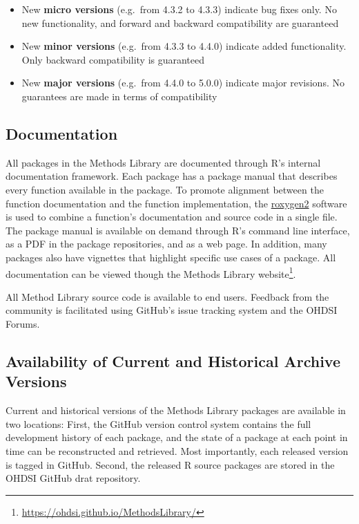 \documentclass[11pt]{book}
\providecommand{\tightlist}{%
  \setlength{\itemsep}{0pt}\setlength{\parskip}{0pt}}
\let\rmarkdownfootnote\footnote%
\def\footnote{\protect\rmarkdownfootnote}
\theoremstyle{definition}
\theoremstyle{definition}
\theoremstyle{definition}
\theoremstyle{remark}
\begin{document}
\begin{itemize}
\tightlist
\item
  New \textbf{micro versions} (e.g.~from 4.3.2 to 4.3.3) indicate bug fixes only. No new functionality, and forward and backward compatibility are guaranteed
\item
  New \textbf{minor versions} (e.g.~from 4.3.3 to 4.4.0) indicate added functionality. Only backward compatibility is guaranteed
\item
  New \textbf{major versions} (e.g.~from 4.4.0 to 5.0.0) indicate major revisions. No guarantees are made in terms of compatibility
\end{itemize}

\hypertarget{documentation-2}{%
\subsection{Documentation}\label{documentation-2}}

All packages in the Methods Library are documented through R's internal documentation framework. Each package has a package manual that describes every function available in the package. To promote alignment between the function documentation and the function implementation, the \href{https://cran.r-project.org/web/packages/roxygen2/vignettes/roxygen2.html}{roxygen2} software is used to combine a function's documentation and source code in a single file. The package manual is available on demand through R's command line interface, as a PDF in the package repositories, and as a web page. In addition, many packages also have vignettes that highlight specific use cases of a package. All documentation can be viewed though the Methods Library website\footnote{\url{https://ohdsi.github.io/MethodsLibrary/}}.

All Method Library source code is available to end users. Feedback from the community is facilitated using GitHub's issue tracking system and the OHDSI Forums.

\hypertarget{availability-of-current-and-historical-archive-versions}{%
\subsection{Availability of Current and Historical Archive Versions}\label{availability-of-current-and-historical-archive-versions}}

Current and historical versions of the Methods Library packages are available in two locations: First, the GitHub version control system contains the full development history of each package, and the state of a package at each point in time can be reconstructed and retrieved. Most importantly, each released version is tagged in GitHub. Second, the released R source packages are stored in the OHDSI GitHub drat repository.
\end{document}
